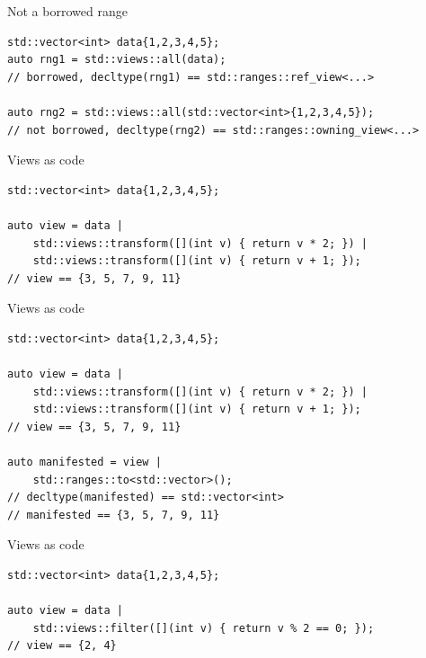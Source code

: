 \documentclass[aspectratio=169]{beamer}
\begin{document}
\begin{frame}[fragile,c]{Not a borrowed range}
\large
\begin{center}
\begin{verbatim}
std::vector<int> data{1,2,3,4,5};
auto rng1 = std::views::all(data);
// borrowed, decltype(rng1) == std::ranges::ref_view<...>

auto rng2 = std::views::all(std::vector<int>{1,2,3,4,5});
// not borrowed, decltype(rng2) == std::ranges::owning_view<...>
\end{verbatim}
\end{center}
\let\thefootnote\relax{}
\end{frame}

\begin{frame}[fragile,c]{Views as code}
\begin{center}
\begin{verbatim}
std::vector<int> data{1,2,3,4,5};

auto view = data | 
    std::views::transform([](int v) { return v * 2; }) |
    std::views::transform([](int v) { return v + 1; });
// view == {3, 5, 7, 9, 11}
\end{verbatim}
\end{center}
\let\thefootnote\relax{}
\end{frame}

\begin{frame}[fragile,c]{Views as code}
\begin{center}
\begin{verbatim}
std::vector<int> data{1,2,3,4,5};

auto view = data | 
    std::views::transform([](int v) { return v * 2; }) |
    std::views::transform([](int v) { return v + 1; });
// view == {3, 5, 7, 9, 11}

auto manifested = view |
    std::ranges::to<std::vector>();
// decltype(manifested) == std::vector<int>
// manifested == {3, 5, 7, 9, 11}
\end{verbatim}
\end{center}
\let\thefootnote\relax{}
\end{frame}

\begin{frame}[fragile,c]{Views as code}
\begin{center}
\begin{verbatim}
std::vector<int> data{1,2,3,4,5};

auto view = data | 
    std::views::filter([](int v) { return v % 2 == 0; });
// view == {2, 4}
\end{verbatim}
\end{center}
\let\thefootnote\relax{}
\end{frame}
\end{document}
